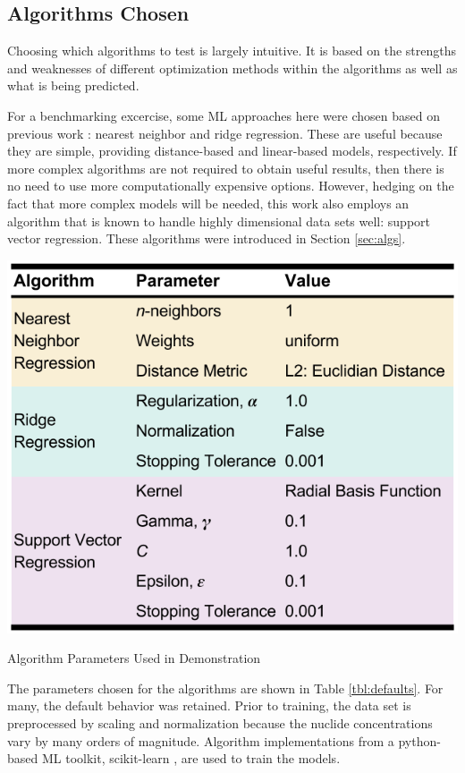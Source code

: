 \subsection{Algorithms Chosen}
\label{sec:choice}

Choosing which algorithms to test is largely intuitive. It is based on the
strengths and weaknesses of different optimization methods within the
algorithms as well as what is being predicted.  

For a benchmarking excercise, some \gls{ML} approaches here were chosen
based on previous work \cite{dayman_feasibility_2013}: nearest neighbor and
ridge regression. These are useful because they are simple, providing
distance-based and linear-based models, respectively. If more complex
algorithms are not required to obtain useful results, then there is no need to
use more computationally expensive options. However, hedging on the fact that
more complex models will be needed, this work also employs an algorithm that is
known to handle highly dimensional data sets well: support vector regression.
These algorithms were introduced in Section \ref{sec:algs}. 

\begin{table}[!htb]
  \centering
  \includegraphics[width=0.8\linewidth]{./chapters/demo_method/defaults.png}
  \caption{Algorithm Parameters Used in Demonstration}
  \label{tbl:defaults}
\end{table}

The parameters chosen for the algorithms are shown in Table \ref{tbl:defaults}.
For many, the default behavior was retained. Prior to training, the data set is
preprocessed by scaling and normalization because the nuclide concentrations
vary by many orders of magnitude. Algorithm implementations from a python-based
\gls{ML} toolkit, scikit-learn \cite{scikit}, are used to train the
models.

